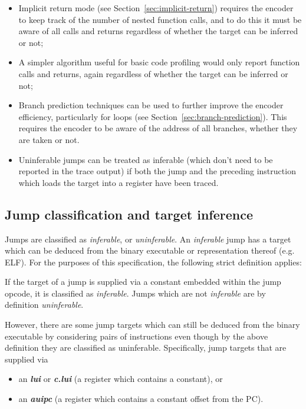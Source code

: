 \begin{itemize}
  \item Implicit return mode (see Section~\ref{sec:implicit-return}) requires the encoder to keep track of the number of nested 
    function calls, and to do this it must be aware of all calls and returns regardless of whether the target can be inferred or not;
  \item A simpler algorithm useful for basic code profiling would only report function calls and returns, again 
    regardless of whether the target can be inferred or not;
  \item Branch prediction techniques can be used to further improve the encoder efficiency, particularly for loops 
    (see Section~\ref{sec:branch-prediction}).  This requires the encoder to be aware of the address of all branches, whether
    they are taken or not.
  \item Uninferable jumps can be treated as inferable (which don't need to be reported in the trace output) if both the jump 
    and the preceding instruction which loads the target into a register have been traced.
\end{itemize}

\subsection{Jump classification and target inference} \label{Jump Classes}

Jumps are classified as \textit{inferable}, or \textit{uninferable}.  An \textit{inferable} jump has a target which can be
deduced from the binary executable or representation thereof (e.g. ELF).  For the purposes of this specification, the following 
strict definition applies:

If the target of a jump is supplied via a constant embedded within the jump opcode, it is classified as \textit{inferable}.
Jumps which are not \textit{inferable} are by definition \textit{uninferable}.

However, there are some jump targets which can still be deduced from the binary executable by considering pairs of instructions
even though by the above definition they are classified as uninferable.  Specifically, jump targets that are supplied via

\begin{itemize}
  \item an \textbf{\textit{lui}} or \textbf{\textit{c.lui}} (a register which contains a constant), or
  \item an \textbf{\textit{auipc}} (a register which contains a constant offset from the PC).
\end{itemize}

